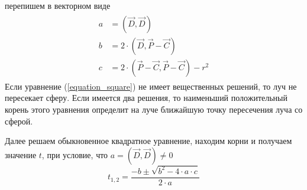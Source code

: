 \documentclass[12pt, a4paper, utf8]{article}
\begin{document}
перепишем в векторном виде
\begin{eqnarray*}
\begin{split}
a &= (\vec{D}, \vec{D}) \\
b &= 2 \cdot (\vec{D}, \vec{P}-\vec{C}) \\
c &= 2 \cdot (\vec{P}-\vec{C},\vec{P}-\vec{C}) - r^2
\end{split}
\end{eqnarray*}
Если уравнение (\ref{equation_square}) не имеет вещественных решений, то луч не пересекает сферу. Если имеется два решения, то наименьший положительный корень этого уравнения определит на луче ближайшую точку пересечения луча со сферой.
\par
Далее решаем обыкновенное квадратное уравнение, находим корни и получаем значение $t$, при условие, что $a = (\vec{D},\vec{D}) \neq 0$
$$
t_{1,2} = \frac{-b \pm \sqrt{b^2 - 4 \cdot a \cdot c}}{2 \cdot a}
$$
\end{document}
